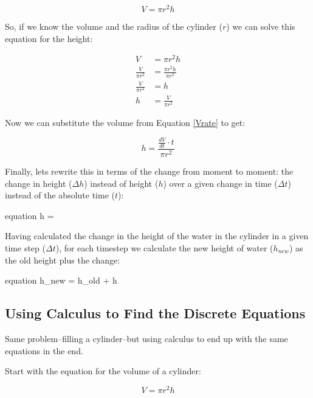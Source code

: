 \documentclass[11pt,fleqn]{article}
\begin{document}
	\begin{equation}
		V = \pi r^2 h
	\end{equation}

So, if we know the volume and the radius of the cylinder ($r$) we can solve this equation for the height:

	\begin{align}
		V &= \pi r^2 h \\
		\frac{V}{\pi r^2} &= \frac{\pi r^2 h}{\pi r^2} \\
	    \frac{V}{\pi r^2} &= h  \\
		h &= \frac{V}{\pi r^2} 
	\end{align}


Now we can substitute the volume from Equation \ref{Vrate} to get:

	\begin{equation}
		h = \frac{\frac{dV}{d t} \cdot t}{\pi r^2}
	\end{equation}

Finally, lets rewrite this in terms of the change from moment to moment: the change in height ($\Delta h$) instead of height ($h$) over a given change in time ($\Delta t$) instead of the absolute time ($t$):

	\begin{empheq}[box=\fbox]{equation}
		\label{dh_eqn}
		\Delta h = 
	\end{empheq}

Having calculated the change in the height of the water in the cylinder in a given time step ($\Delta t$), for each timestep we calculate the new height of water ($h_{new}$) as the old height plus the change:

	\begin{empheq}[box=\fbox]{equation}
		\label{hnew_eqn}
		h_{new} = h_{old} + \Delta h
	\end{empheq}


\subsection{Using Calculus to Find the Discrete Equations} \label{CodeCalc}

	Same problem--filling a cylinder--but using calculus to end up with the same equations in the end.
	
	Start with the equation for the volume of a cylinder:
	
		\begin{equation}
			V = \pi r^2 h
		\end{equation}
	
\end{document}
